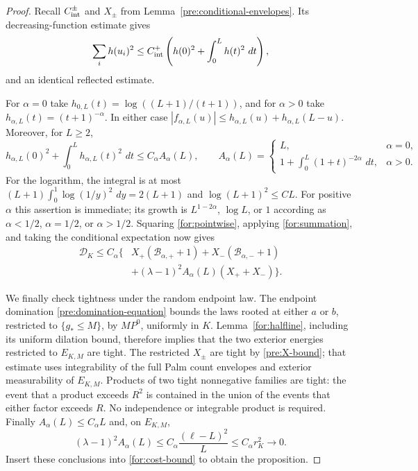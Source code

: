 \documentclass[11pt,reqno]{amsart}
\numberwithin{equation}{section}
\theoremstyle{definition}
\newcommand{\1}{\mathbf 1}
\newcommand{\dd}{\,d}
\newcommand{\abs}[1]{\left|#1\right|}
\begin{document}
\begin{proof}
Recall $C_{\rm int}^\pm$ and $X_\pm$ from
Lemma~\ref{pre:conditional-envelopes}.  Its decreasing-function
estimate gives
\begin{equation}\label{for:summation}
 \sum_i h(u_i)^2
 \le C_{\rm int}^+
 \left(h(0)^2+\int_0^L h(t)^2\,\dd t\right),
\end{equation}
and an identical reflected estimate.

For $\alpha=0$ take
$h_{0,L}(t)=\log((L+1)/(t+1))$, and for $\alpha>0$ take
$h_{\alpha,L}(t)=(t+1)^{-\alpha}$.  In either case
$\abs{f_{\alpha,L}(u)}\le h_{\alpha,L}(u)+h_{\alpha,L}(L-u)$.
Moreover, for $L\ge2$,
\[
 h_{\alpha,L}(0)^2+\int_0^L h_{\alpha,L}(t)^2\,\dd t
 \le C_\alpha A_\alpha(L),\qquad
 A_\alpha(L)=
 \begin{cases}
 L,&\alpha=0,\\
 \displaystyle1+\int_0^L(1+t)^{-2\alpha}\,\dd t,&\alpha>0.
 \end{cases}
\]
For the logarithm, the integral is at most
$(L+1)\int_0^1\log(1/y)^2\,\dd y=2(L+1)$ and
$\log(L+1)^2\le CL$.  For positive $\alpha$ this assertion is
immediate; its growth is $L^{1-2\alpha}$, $\log L$, or $1$
according as $\alpha<1/2$, $\alpha=1/2$, or $\alpha>1/2$.
Squaring \eqref{for:pointwise}, applying \eqref{for:summation}, and
taking the conditional expectation now gives
\begin{equation}\label{for:cost-bound}
 \begin{split}
 \mathcal D_K\le C_\alpha\bigl\{&
 X_+(\mathcal B_{\alpha,+}+1)
 +X_-(\mathcal B_{\alpha,-}+1)\\
 &+(\lambda-1)^2A_\alpha(L)(X_++X_-)\bigr\}.
 \end{split}
\end{equation}

We finally check tightness under the random endpoint law.
The endpoint domination \eqref{pre:domination-equation} bounds the
laws rooted at either $a$ or $b$, restricted to $\{g_*\le M\}$,
by $M P^0$, uniformly in $K$.
Lemma~\ref{for:halfline}, including its uniform dilation bound,
therefore implies that the two exterior energies restricted to
$E_{K,M}$ are tight.  The restricted $X_\pm$ are tight by
\eqref{pre:X-bound}; that estimate uses integrability of the full
Palm count envelopes and exterior measurability of $E_{K,M}$.
Products of two tight
nonnegative families are tight: the event that a product exceeds
$R^2$ is contained in the union of the events that either factor
exceeds $R$.  No independence or integrable product is required.
Finally $A_\alpha(L)\le C_\alpha L$ and, on $E_{K,M}$,
\[
 (\lambda-1)^2A_\alpha(L)
 \le C_\alpha\frac{(\ell-L)^2}{L}
 \le C_\alpha r_K^2\longrightarrow0.
\]
Insert these conclusions into \eqref{for:cost-bound} to obtain the
proposition.
\end{proof}
\end{document}
